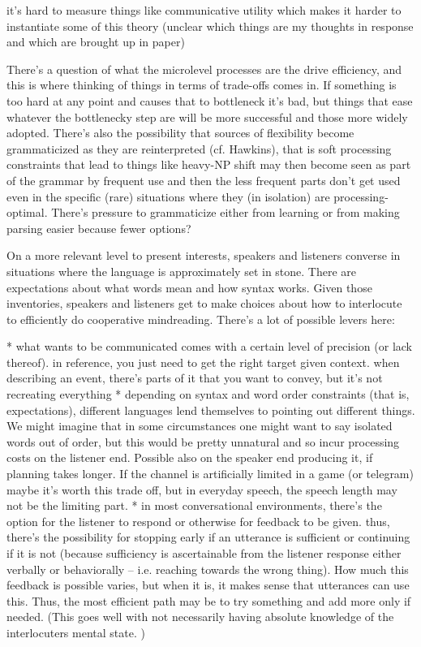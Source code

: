 \documentclass[]{article}
\begin{document}
\cite{gibson2019} it's hard to measure things like communicative utility which makes it harder to instantiate some of this theory (unclear which things are my thoughts in response and which are brought up in paper) 



There's a question of what the microlevel processes are the drive efficiency, and this is where thinking of things in terms of trade-offs comes in. If something is too hard at any point and causes that to bottleneck it's bad, but things that ease whatever the bottlenecky step are will be more successful and those more widely adopted. There's also the possibility that sources of flexibility become grammaticized as they are reinterpreted (cf. Hawkins), that is soft processing constraints that lead to things like heavy-NP shift may then become seen as part of the grammar by frequent use and then the less frequent parts don't get used even in the specific (rare) situations where they (in isolation) are processing-optimal. There's pressure to grammaticize either from learning or from making parsing easier because fewer options? 


On a more relevant level to present interests, speakers and listeners converse in situations where the language is approximately set in stone. There are expectations about what words mean and how syntax works. Given those inventories, speakers and listeners get to make choices about how to interlocute to efficiently do cooperative mindreading. There's a lot of possible levers here: 

* what wants to be communicated comes with a certain level of precision (or lack thereof). in reference, you just need to get the right target given context. when describing an event, there's parts of it that you want to convey, but it's not recreating everything
* depending on syntax and word order constraints (that is, expectations), different languages lend themselves to pointing out different things. We might imagine that in some circumstances one might want to say isolated words out of order, but this would be pretty unnatural and so incur processing costs on the listener end. Possible also on the speaker end producing it, if planning takes longer. If the channel is artificially limited in a game (or telegram) maybe it's worth this trade off, but in everyday speech, the speech length may not be the limiting part. 
* in most conversational environments, there's the option for the listener to respond or otherwise for feedback to be given. thus, there's the possibility for stopping early if an utterance is sufficient or continuing if it is not (because sufficiency is ascertainable from the listener response either verbally or behaviorally -- i.e. reaching towards the wrong thing). How much this feedback is possible varies, but when it is, it makes sense that utterances can use this. Thus, the most efficient path may be to try something and add more only if needed. (This goes well with not necessarily having absolute knowledge of the interlocuters mental state. )
\end{document}

